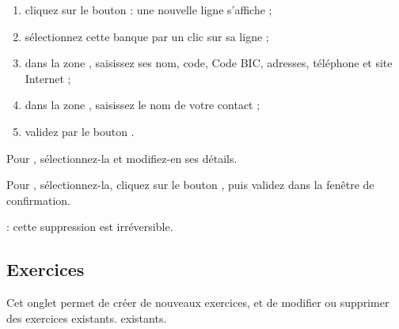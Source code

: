 \begin{enumerate}
	\item cliquez sur le bouton  : une nouvelle ligne  s'affiche ;
	\item sélectionnez cette banque par un clic sur sa ligne ;
	\item dans la zone , saisissez ses nom, code, Code BIC, adresses, téléphone et site Internet ;
	\item dans la zone , saisissez le nom de votre contact ;
	\item validez par le bouton .
\end{enumerate}

\ifIllustration
\else
\fi

Pour , sélectionnez-la et modifiez-en ses détails.

Pour , sélectionnez-la, cliquez sur le bouton , puis validez dans la fenêtre de confirmation.

 : cette suppression est irréversible.


\subsection{Exercices\label{setup-resources-financialyear}}

Cet onglet permet de créer de nouveaux exercices, et de modifier ou supprimer des exercices \ifIllustration existants.
\else existants.
\fi

